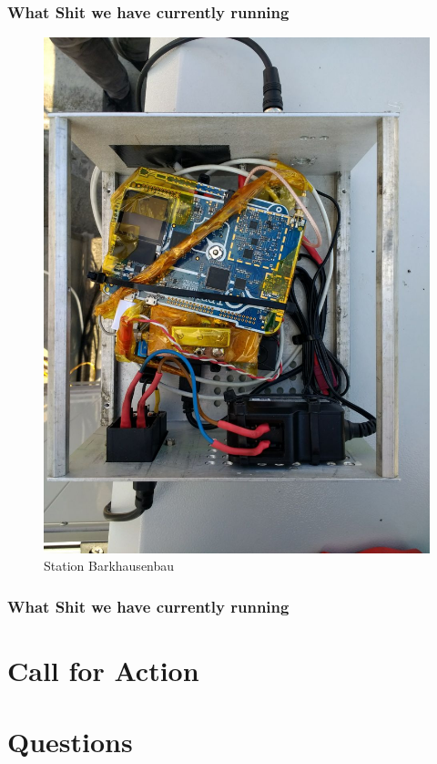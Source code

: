 \documentclass[aspectratio=169]{beamer}
\begin{document}

\begin{frame}
\frametitle{What Shit we have currently running}

\begin{figure}

\centering
\includegraphics[height=0.94\textheight, angle=90]{figs/station_barkhausen.jpg}
\caption{ Station Barkhausenbau }
\end{figure}

\end{frame}


\begin{frame}
\frametitle{What Shit we have currently running}

\begin{tikzpicture}


\end{tikzpicture}

\end{frame}


\section{Call for Action}

\section{Questions}
\end{document}

